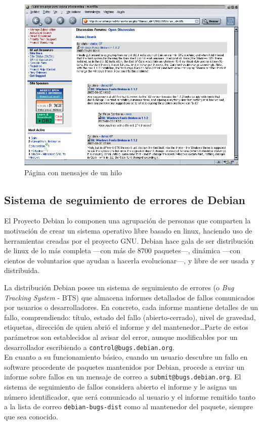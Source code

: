  \begin{figure}[H]
    \centering
    \includegraphics[bb=0 0 800 600, width=12cm, keepaspectratio]{img/foro2}
    \caption{Página con mensajes de un hilo}
    \label{figura:foro_msgs}
 \end{figure}


\subsection{Sistema de seguimiento de errores de Debian}
\label{intro_BTS}

El Proyecto Debian lo componen una agrupación de personas que comparten
la motivación de crear un sistema operativo libre basado en linux, haciendo
uso de herramientas creadas por el proyecto GNU. Debian hace gala de ser
distribución de linux de lo más completa ---con más de 8700 paquetes---,
dinámica ---con cientos de voluntarios que ayudan a hacerla evolucionar---,
y libre de ser usada y distribuida.

La distribución Debian posee un sistema de seguimiento de errores
(o \textit{Bug Tracking System} - BTS) que almacena informes detallados
de fallos comunicados por usuarios o desarrolladores.
En concreto, cada informe mantiene detalles
de un fallo, comprendiendo: título, estado del fallo (abierto-cerrado),
nivel de gravedad, etiquetas, dirección de quien abrió el informe y del
mantenedor\ldots Parte de estos parámetros son establecidos al avisar del
error, aunque modificables por un desarrollador escribiendo a
\texttt{control@bugs.debian.org}.
\\[0.5cm]
En cuanto a su funcionamiento básico, cuando un usuario descubre un fallo
en software procedente de paquetes mantenidos por Debian, procede a enviar
un informe sobre fallos en un mensaje
de correo a \texttt{submit@\-bugs.debian.org}. El sistema de seguimiento de fallos
considera abierto el informe y le asigna un número identificador,
que será comunicado al usuario y
el informe remitido tanto a la lista de correo \texttt{debian-bugs-dist} como
al mantenedor del paquete, siempre que sea conocido.

